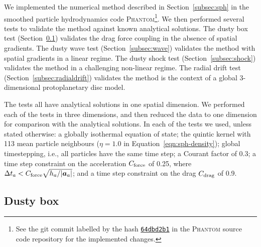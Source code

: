 \documentclass[fleqn,usenatbib]{mnras}
\let\vec\bm
\begin{document}
We implemented the numerical method described in Section~\ref{subsec:sph} in the
smoothed particle hydrodynamics code \textsc{Phantom}\footnote{See the git
commit labelled by the hash
\href{https://github.com/danieljprice/phantom/commit/64dbd2b124ca74051eed920d6cad0a2e83157478}{\texttt{64dbd2b1}}
in the \textsc{Phantom} source code repository for the implemented changes.}. We
then performed several tests to validate the method against known analytical
solutions. The dusty box test (Section~\ref{subsec:box}) validates the drag
force coupling in the absence of spatial gradients. The dusty wave test
(Section~\ref{subsec:wave}) validates the method with spatial gradients in a
linear regime. The dusty shock test (Section~\ref{subsec:shock}) validates the
method in a challenging non-linear regime. The radial drift test
(Section~\ref{subsec:radialdrift}) validates the method is the context of a
global 3-dimensional protoplanetary disc model.

The tests all have analytical solutions in one spatial dimension. We performed
each of the tests in three dimensions, and then reduced the data to one
dimension for comparison with the analytical solutions. In each of the tests we
used, unless stated otherwise: a globally isothermal equation of state; the
quintic kernel with 113 mean particle neighbours (\(\eta = 1.0\) in
Equation~\ref{eqn:sph-density}); global timestepping, i.e., all particles have
the same time step; a Courant factor of 0.3; a time step constraint on the
acceleration \( C_{\rm force} \) of 0.25, where \(\Delta t_a < C_{\rm force}
\sqrt{h_a / |\vec{a}_a|} \); and a time step constraint on the drag \(C_{\rm
drag}\) of 0.9.


\subsection{Dusty box}%
\label{subsec:box}
\end{document}
